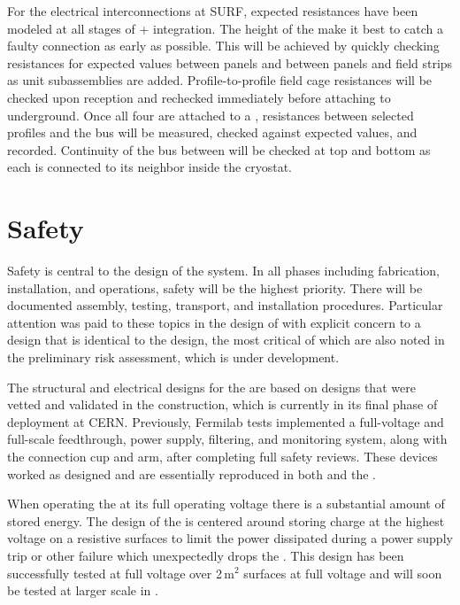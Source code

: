 For the electrical interconnections  at SURF, expected resistances have been modeled at all stages of
+ integration.  The height of the  make it best to catch a
faulty connection as early as possible.  This will be achieved by
quickly checking resistances for expected values between  panels and between  panels and field strips as  unit subassemblies are added.  Profile-to-profile field cage resistances
will be checked upon reception and rechecked immediately before
attaching to  underground.  Once all four  are attached to a
, resistances between selected  profiles and the  bus will be
measured, checked against expected values, and recorded. Continuity of
the  bus between  will be checked at top and bottom as each 
is connected to its neighbor inside the cryostat.


\section{Safety}
\label{sec:fdsp-hv-safety}

Safety is central to the design of the  system. In all phases including fabrication, installation, and operations, safety will be the highest priority. There will be documented assembly, testing, transport, and installation procedures. Particular attention was paid to these topics in the design of  
  with explicit concern to a design that is identical to the  design, the most critical of which are also noted in the preliminary  risk assessment, which is under development. %

The structural and electrical designs for the   are based on designs that were vetted and validated in the  construction, which is currently in its final phase of deployment at CERN. Previously, Fermilab  tests implemented a full-voltage and full-scale  feedthrough, power supply, filtering, and monitoring system, along with the  connection cup and arm, after completing full safety reviews. These devices worked as designed and are essentially reproduced in both  and the . 

When operating the  at its full operating voltage there is a substantial amount of stored energy. The design of the  is centered around storing charge  at the highest voltage on a resistive surfaces to limit the power dissipated during a power supply trip or other failure which unexpectedly drops the . This design has been successfully tested at full voltage over \num{2}\,m$^2$ surfaces at full voltage and will soon be tested at larger scale in .  

